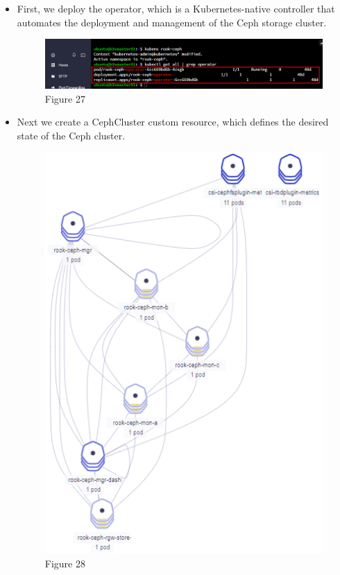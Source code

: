 \begin{itemize}[label={--}]
    \item First, we deploy the operator, which is a Kubernetes-native controller that automates the deployment and management of the Ceph storage cluster. 
    \begin{figure}[H]\centering
    \includegraphics[width=1.0\textwidth,angle=00]{assets/f27.png}
    \caption{Figure 27 }
    \label{fig:f27}
    \end{figure}
    \item Next we create a CephCluster custom resource, which defines the desired state of the Ceph cluster.
    \begin{figure}[H]\centering
    \includegraphics[width=1.0\textwidth,angle=00]{assets/f28.png}
    \caption{Figure 28 }
    \label{fig:f28}
    \end{figure}
    \end{itemize}
